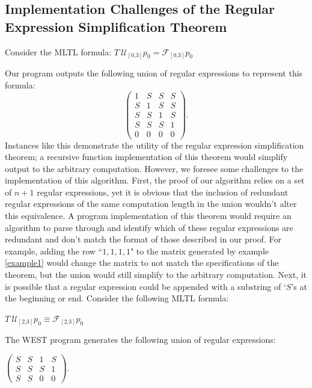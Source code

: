 \documentclass[runningheads]{llncs}
\begin{document}
\subsection{Implementation Challenges of the Regular Expression Simplification Theorem}
\begin{example} \label{example1}
Consider the MLTL formula:
$T \ \mathcal{U_{[\text{0,3}]}} p_0 = \mathcal{F_{[\text{0,3}]}}p_0$
\end{example}
Our program outputs the following union of regular expressions to represent this formula:
\[
    \begin{pmatrix}
    1 & S & S & S\\
    S & 1 & S & S\\
    S & S & 1 & S\\
    S & S & S & 1\\
    0 & 0 & 0 & 0
    \end{pmatrix}.
\]
Instances like this demonstrate the utility of the regular expression simplification theorem; a recursive function implementation of this theorem would simplify output to the arbitrary computation. However, we foresee some challenges to the implementation of this algorithm. 
First, the proof of our algorithm relies on a set of $n+1$ regular expressions, yet it is obvious that the inclusion of redundant regular expressions of the same computation length in the union wouldn't alter this equivalence. A program implementation of this theorem would require an algorithm to parse through and identify which of these regular expressions are redundant and don't match the format of those described in our proof. For example, adding the row ``$1,1,1,1$" to the matrix generated by example \ref{example1} would change the matrix to not match the specifications of the theorem, but the union would still simplify to the arbitrary computation.
Next, it is possible that a regular expression could be appended with a substring of `$S$'s at the beginning or end. Consider the following MLTL formula:
\begin{example} \label{example2}
$T \ \mathcal{U_{[\text{2,3}]}} p_0 \equiv \mathcal{F_{[\text{2,3}]}}p_0$
\end{example}
\noindent The WEST program generates the following union of regular expressions:
\begin{center}
$
    \begin{pmatrix}
    S & S & 1 & S\\
    S & S & S & 1\\
    S & S & 0 & 0
    \end{pmatrix}.
$
\end{center}
\end{document}
